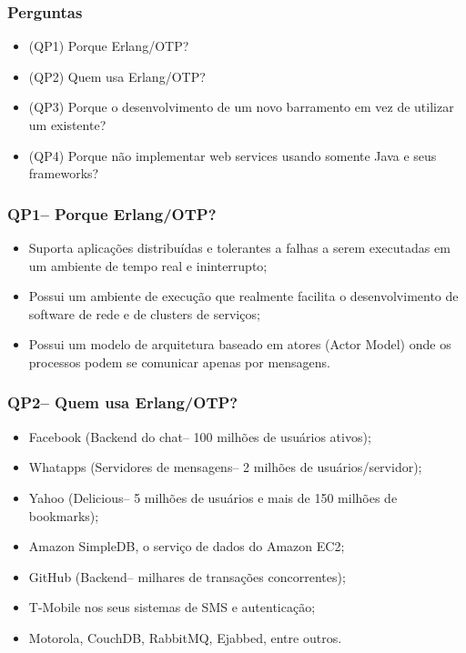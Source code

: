 \documentclass{beamer}
\begin{document}
\begin{frame}
  \frametitle{Perguntas}

  \begin{exampleblock}{}
  
	  \begin{itemize}
		\item<1->(QP1) Porque Erlang/OTP?
		\item<1->(QP2) Quem usa Erlang/OTP?
	    \item<1->(QP3) Porque o desenvolvimento de um novo barramento em vez de utilizar um existente?
	    \item<1->(QP4) Porque não implementar web services usando somente Java e seus frameworks?
	  \end{itemize}
  
  \end{exampleblock}

  
\end{frame}


\begin{frame}
  \frametitle{QP1-- Porque Erlang/OTP?}

    \begin{itemize}
       \item<1-> Suporta aplicações distribuídas e tolerantes a falhas a serem executadas em um ambiente de tempo real e ininterrupto;
       \item<1-> Possui um ambiente de execução que realmente facilita o desenvolvimento de software de rede e de clusters de serviços;
       
       \item<1-> Possui um modelo de arquitetura baseado em atores (Actor Model) onde os processos podem 
       se comunicar apenas por mensagens.
       
    \end{itemize}
  
\end{frame}


\begin{frame}
  \frametitle{QP2-- Quem usa Erlang/OTP?}

	  \begin{itemize}
		\item<1->Facebook (Backend do chat-- 100 milhões de usuários ativos);
		\item<1->Whatapps (Servidores de mensagens-- 2 milhões de usuários/servidor);
		\item<1->Yahoo (Delicious-- 5 milhões de usuários e mais de 150 milhões de bookmarks);
		\item<1->Amazon SimpleDB, o serviço de dados do Amazon EC2;
		\item<1->GitHub (Backend-- milhares de transações concorrentes);
		\item<1->T-Mobile nos seus sistemas de SMS e autenticação;
		\item<1->Motorola, CouchDB, RabbitMQ, Ejabbed, entre outros.
						
	   \end{itemize}
  
\end{frame}
\end{document}
